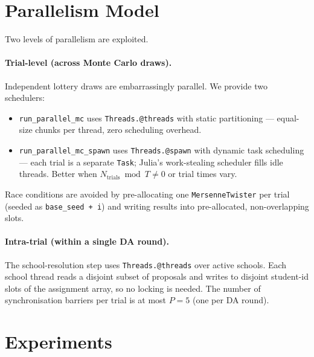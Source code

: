 \documentclass{article}
\theoremstyle{plain}
\theoremstyle{definition}
\theoremstyle{remark}
\begin{document}
\section{Parallelism Model}
\label{sec:parallel}

Two levels of parallelism are exploited.

\paragraph{Trial-level (across Monte Carlo draws).}
Independent lottery draws are embarrassingly parallel. We provide two
schedulers:

\begin{itemize}
  \item \texttt{run\_parallel\_mc} uses \texttt{Threads.@threads} with
    static partitioning --- equal-size chunks per thread, zero scheduling
    overhead.
  \item \texttt{run\_parallel\_mc\_spawn} uses \texttt{Threads.@spawn} with
    dynamic task scheduling --- each trial is a separate \texttt{Task};
    Julia's work-stealing scheduler fills idle threads. Better when $N_\text{trials}
    \bmod T \neq 0$ or trial times vary.
\end{itemize}

Race conditions are avoided by pre-allocating one \texttt{MersenneTwister}
per trial (seeded as \texttt{base\_seed + i}) and writing results into
pre-allocated, non-overlapping slots.

\paragraph{Intra-trial (within a single DA round).}
The school-resolution step uses \texttt{Threads.@threads} over active
schools. Each school thread reads a disjoint subset of proposals and writes
to disjoint student-id slots of the assignment array, so no locking is
needed. The number of synchronisation barriers per trial is at most $P = 5$
(one per DA round).

\section{Experiments}
\label{sec:experiments}
\end{document}

